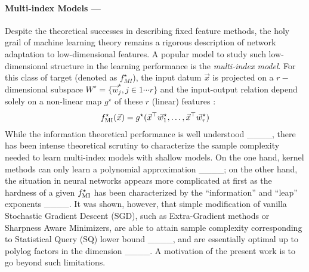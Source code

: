 \paragraph{Multi-index Models ---}
Despite the theoretical successes in describing fixed feature methods, the holy grail of machine learning theory remains a rigorous description of network adaptation to low-dimensional features. A popular model to study such low-dimensional structure in the learning performance is the  {\it multi-index model}. For this class of target (denoted as $f^\star_{MI}$), the input datum $\vec x$ is projected on a $r-$dimensional subspace $W^\star = \{\vec{w}^\star_j, j \in 1 \cdots r\}$ and the input-output relation depend solely on a non-linear map $g^\star$ of these $r$ (linear) features : 
\begin{align}
    f^\star_{\rm MI}(\vec x) = g^\star(\vec{x}^\top \vec{w}^\star_1, \dots,\vec{x}^\top \vec{w}^\star_r)
\end{align}
While the information theoretical performance is well understood ____, there has been intense theoretical scrutiny to characterize the sample complexity needed to learn multi-index models with shallow models. On the one hand, kernel methods can only learn a polynomial approximation ____; on the other hand, the situation in neural networks appears more complicated at first as the hardness of a given $f^\star_{\rm MI}$ has been characterized by the ``information'' and ``leap'' exponents ____.
It was shown, however, that simple modification of vanilla Stochastic Gradient Descent (SGD), such as Extra-Gradient methods or Sharpness Aware Minimizers, are able to attain sample complexity corresponding to Statistical Query (SQ) lower bound ____, and are essentially optimal up to polylog factors in the dimension ____. A motivation of the present work is to go beyond such limitations.
%